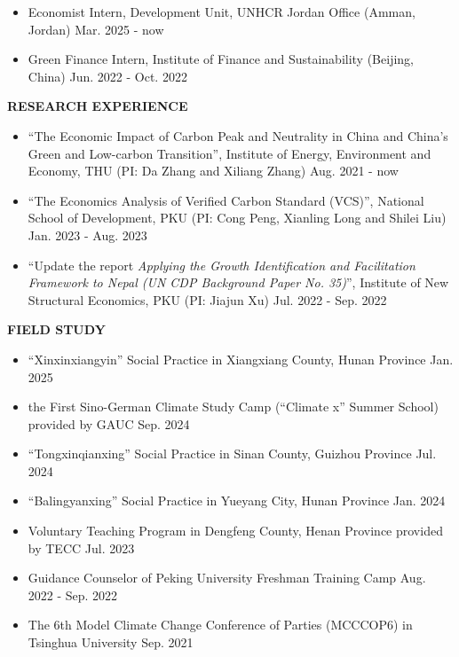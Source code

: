 \documentclass[UTF8]{ctexbook}
\begin{document}
\begin{itemize}
    \item Economist Intern, Development Unit, UNHCR Jordan Office (Amman, Jordan) \hfill Mar. 2025 - now
    \item Green Finance Intern, Institute of Finance and Sustainability (Beijing, China) \hfill Jun. 2022 - Oct. 2022
\end{itemize}

\vspace{12pt}

\begin{center}
    \textbf{RESEARCH EXPERIENCE}
\end{center}


\begin{itemize}
    \item ``The Economic Impact of Carbon Peak and Neutrality in China and China's Green and Low-carbon Transition'', Institute of Energy, Environment and Economy, THU (PI: Da Zhang and Xiliang Zhang) \hfill Aug. 2021 - now
    \item ``The Economics Analysis of Verified Carbon Standard (VCS)'', National School of Development, PKU (PI: Cong Peng, Xianling Long and Shilei Liu) \hfill Jan. 2023 - Aug. 2023
    \item ``Update the report \textit{Applying the Growth Identification and Facilitation Framework to Nepal (UN CDP Background Paper No. 35)}'', Institute of New Structural Economics, PKU (PI: Jiajun Xu) \hfill Jul. 2022 - Sep. 2022
\end{itemize}

\vspace{12pt}

\begin{center}
    \textbf{FIELD STUDY}
\end{center}


\begin{itemize}
    \item ``Xinxinxiangyin'' Social Practice in Xiangxiang County, Hunan Province \hfill Jan. 2025
    \item the First Sino-German Climate Study Camp (``Climate x'' Summer School) provided by GAUC \hfill Sep. 2024
    \item ``Tongxinqianxing'' Social Practice in Sinan County, Guizhou Province \hfill Jul. 2024
    \item ``Balingyanxing'' Social Practice in Yueyang City, Hunan Province \hfill Jan. 2024
    \item Voluntary Teaching Program in Dengfeng County, Henan Province provided by TECC  \hfill Jul. 2023
    \item Guidance Counselor of Peking University Freshman Training Camp \hfill Aug. 2022 - Sep. 2022
    \item The 6th Model Climate Change Conference of Parties (MCCCOP6) in Tsinghua University \hfill Sep. 2021
\end{itemize}
\end{document}
